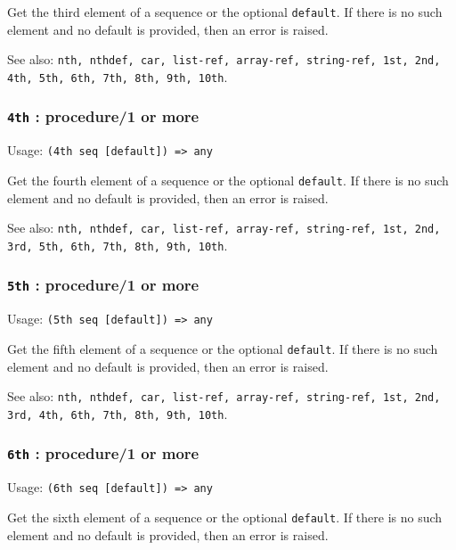 \documentclass[
]{article}
\newcommand{\passthrough}[1]{#1}
\begin{document}
Get the third element of a sequence or the optional
\passthrough{\lstinline!default!}. If there is no such element and no
default is provided, then an error is raised.

See also:
\passthrough{\lstinline!nth, nthdef, car, list-ref, array-ref, string-ref, 1st, 2nd, 4th, 5th, 6th, 7th, 8th, 9th, 10th!}.

\hypertarget{th-procedure1-or-more-1}{%
\subsubsection{\texorpdfstring{\texttt{4th} : procedure/1 or
more}{4th : procedure/1 or more}}\label{th-procedure1-or-more-1}}

Usage: \passthrough{\lstinline!(4th seq [default]) => any!}

Get the fourth element of a sequence or the optional
\passthrough{\lstinline!default!}. If there is no such element and no
default is provided, then an error is raised.

See also:
\passthrough{\lstinline!nth, nthdef, car, list-ref, array-ref, string-ref, 1st, 2nd, 3rd, 5th, 6th, 7th, 8th, 9th, 10th!}.

\hypertarget{th-procedure1-or-more-2}{%
\subsubsection{\texorpdfstring{\texttt{5th} : procedure/1 or
more}{5th : procedure/1 or more}}\label{th-procedure1-or-more-2}}

Usage: \passthrough{\lstinline!(5th seq [default]) => any!}

Get the fifth element of a sequence or the optional
\passthrough{\lstinline!default!}. If there is no such element and no
default is provided, then an error is raised.

See also:
\passthrough{\lstinline!nth, nthdef, car, list-ref, array-ref, string-ref, 1st, 2nd, 3rd, 4th, 6th, 7th, 8th, 9th, 10th!}.

\hypertarget{th-procedure1-or-more-3}{%
\subsubsection{\texorpdfstring{\texttt{6th} : procedure/1 or
more}{6th : procedure/1 or more}}\label{th-procedure1-or-more-3}}

Usage: \passthrough{\lstinline!(6th seq [default]) => any!}

Get the sixth element of a sequence or the optional
\passthrough{\lstinline!default!}. If there is no such element and no
default is provided, then an error is raised.
\end{document}
